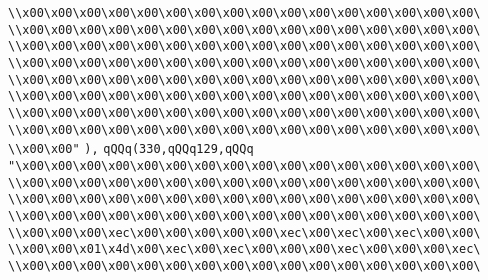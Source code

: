\verb|\\x00\x00\x00\x00\x00\x00\x00\x00\x00\x00\x00\x00\x00\x00\x00\x00\|\newline
\verb|\\x00\x00\x00\x00\x00\x00\x00\x00\x00\x00\x00\x00\x00\x00\x00\x00\|\newline
\verb|\\x00\x00\x00\x00\x00\x00\x00\x00\x00\x00\x00\x00\x00\x00\x00\x00\|\newline
\verb|\\x00\x00\x00\x00\x00\x00\x00\x00\x00\x00\x00\x00\x00\x00\x00\x00\|\newline
\verb|\\x00\x00\x00\x00\x00\x00\x00\x00\x00\x00\x00\x00\x00\x00\x00\x00\|\newline
\verb|\\x00\x00\x00\x00\x00\x00\x00\x00\x00\x00\x00\x00\x00\x00\x00\x00\|\newline
\verb|\\x00\x00\x00\x00\x00\x00\x00\x00\x00\x00\x00\x00\x00\x00\x00\x00\|\newline
\verb|\\x00\x00\x00\x00\x00\x00\x00\x00\x00\x00\x00\x00\x00\x00\x00\x00\|\newline
\verb|\\x00\x00"|\newline
\verb|),|\newline
\verb|qQQq(330,qQQq129,qQQq|\newline
\verb|"\x00\x00\x00\x00\x00\x00\x00\x00\x00\x00\x00\x00\x00\x00\x00\x00\|\newline
\verb|\\x00\x00\x00\x00\x00\x00\x00\x00\x00\x00\x00\x00\x00\x00\x00\x00\|\newline
\verb|\\x00\x00\x00\x00\x00\x00\x00\x00\x00\x00\x00\x00\x00\x00\x00\x00\|\newline
\verb|\\x00\x00\x00\x00\x00\x00\x00\x00\x00\x00\x00\x00\x00\x00\x00\x00\|\newline
\verb|\\x00\x00\x00\xec\x00\x00\x00\x00\x00\xec\x00\xec\x00\xec\x00\x00\|\newline
\verb|\\x00\x00\x01\x4d\x00\xec\x00\xec\x00\x00\x00\xec\x00\x00\x00\xec\|\newline
\verb|\\x00\x00\x00\x00\x00\x00\x00\x00\x00\x00\x00\x00\x00\x00\x00\x00\|\newline
